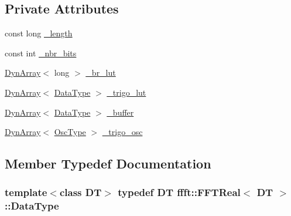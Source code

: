 \subsection*{Private Attributes}
\begin{DoxyCompactItemize}
\item 
const long \hyperlink{classffft_1_1FFTReal_a04c882856db18a8be9c2c0b74fa4faf5}{\+\_\+length}
\item 
const int \hyperlink{classffft_1_1FFTReal_a009acfbabe3450f2d9cb0bcb7eb7a366}{\+\_\+nbr\+\_\+bits}
\item 
\hyperlink{classffft_1_1DynArray}{Dyn\+Array}$<$ long $>$ \hyperlink{classffft_1_1FFTReal_a0030146a32be3c87c47379c4db2caf12}{\+\_\+br\+\_\+lut}
\item 
\hyperlink{classffft_1_1DynArray}{Dyn\+Array}$<$ \hyperlink{classffft_1_1FFTReal_a606148f1cf8c3b7d705473932fc063d1}{Data\+Type} $>$ \hyperlink{classffft_1_1FFTReal_a5c28c732a8f3a262bc6e0527c3903970}{\+\_\+trigo\+\_\+lut}
\item 
\hyperlink{classffft_1_1DynArray}{Dyn\+Array}$<$ \hyperlink{classffft_1_1FFTReal_a606148f1cf8c3b7d705473932fc063d1}{Data\+Type} $>$ \hyperlink{classffft_1_1FFTReal_a9e29976841e3bf469336e3ea54e918f3}{\+\_\+buffer}
\item 
\hyperlink{classffft_1_1DynArray}{Dyn\+Array}$<$ \hyperlink{classffft_1_1FFTReal_a3b9f6dae05435b3696c6c84155e0953a}{Osc\+Type} $>$ \hyperlink{classffft_1_1FFTReal_a555f6fccc6ae27c97c96c5a1ddfac971}{\+\_\+trigo\+\_\+osc}
\end{DoxyCompactItemize}


\subsection{Member Typedef Documentation}
\subsubsection[{\texorpdfstring{Data\+Type}{DataType}}]{\setlength{\rightskip}{0pt plus 5cm}template$<$class DT$>$ typedef DT {\bf ffft\+::\+F\+F\+T\+Real}$<$ DT $>$\+::{\bf Data\+Type}}\hypertarget{classffft_1_1FFTReal_a606148f1cf8c3b7d705473932fc063d1}{}\label{classffft_1_1FFTReal_a606148f1cf8c3b7d705473932fc063d1}
